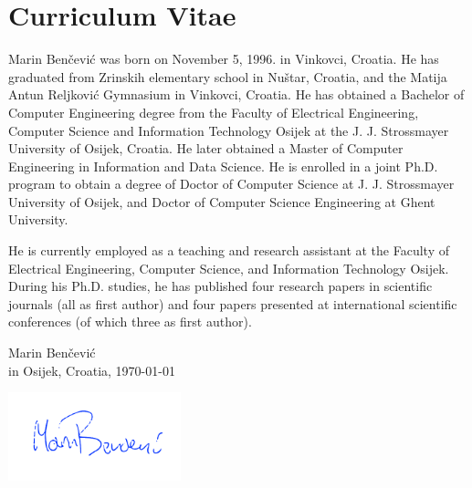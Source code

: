 \documentclass[
  11pt, %
  oneside, %
  english, %
  singlespacing, %
  liststotoc, %
  headsepline, %
  chapterinoneline, %
]{MastersDoctoralThesis} %
\begin{document}
\begin{refsection}

\printbibliography[heading=subbibintoc]
\end{refsection}

\begin{refsection}

\printbibliography[heading=subbibintoc]
\end{refsection}





\pagestyle{plain}
\chapter{Curriculum Vitae}

Marin Benčević was born on November 5, 1996\@. in Vinkovci, Croatia. He has graduated from Zrinskih elementary school in Nuštar, Croatia, and the Matija Antun Reljković Gymnasium in Vinkovci, Croatia. He has obtained a Bachelor of Computer Engineering degree from the Faculty of Electrical Engineering, Computer Science and Information Technology Osijek at the J. J. Strossmayer University of Osijek, Croatia. He later obtained a Master of Computer Engineering in Information and Data Science. He is enrolled in a joint Ph.D. program to obtain a degree of Doctor of Computer Science at J. J. Strossmayer University of Osijek, and Doctor of Computer Science Engineering at Ghent University.

He is currently employed as a teaching and research assistant at the Faculty of Electrical Engineering, Computer Science, and Information Technology Osijek. During his Ph.D. studies, he has published four research papers in scientific journals (all as first author) and four papers presented at international scientific conferences (of which three as first author).

\vspace{3cm}

\begin{flushright}
Marin Benčević\\
in Osijek, Croatia, \today

\includegraphics[width=5cm]{images/signature.png}
\end{flushright}
\end{document}
